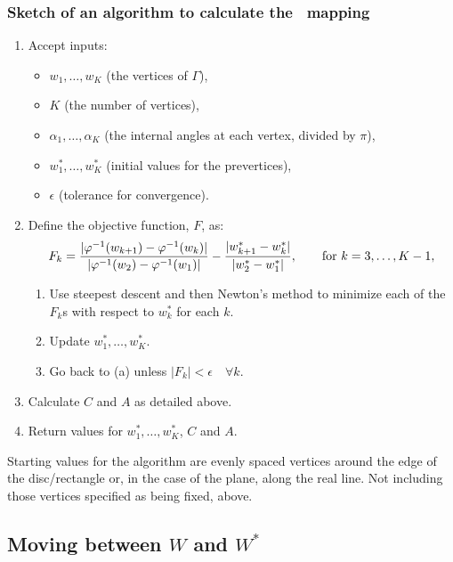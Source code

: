 \subsubsection{Sketch of an algorithm to calculate the \sch\ mapping}
\label{algorithmsketch}
\label{cor-e7}
\begin{enumerate}
\item Accept inputs:
   \begin{itemize} 
      \item $w_1,\dots,w_K$ (the vertices of $\Gamma$),
      \item $K$ (the number of vertices),
      \item $\alpha_1,\dots,\alpha_K$ (the internal angles at each vertex, divided by $\pi$),
      \item \label{cor-3s20}$w^*_1,\dots,w^*_K$ (initial values for the prevertices),
      \item $\epsilon$ (tolerance for convergence).
   \end{itemize}
\item Define the objective function, $F$, as:
 \begin{equation*}
F_k=\frac{\vert \varphi^{-1}(w_{k+1}) -  \varphi^{-1}(w_k) \vert}{\vert \varphi^{-1}(w_2)-\varphi^{-1}(w_1)\vert} - \frac{\vert w^*_{k+1} - w^*_k\vert}{\vert w^*_2 - w^*_1\vert}, \qquad \text{for } k=3,\dots,K-1,
 \end{equation*}
\begin{enumerate}
\item Use steepest descent and then Newton's method to minimize each of the $F_k$s with respect to $w^*_k$ for each $k$.
\item Update $w^*_1,\dots,w^*_K$.
\item Go back to (a) unless $\vert F_k \vert < \epsilon \quad \forall k$. 
\end{enumerate}
\item Calculate $C$ and $A$ as detailed above.
\item Return values for $w^*_1,\dots,w^*_K$, $C$ and $A$.
\end{enumerate}

Starting values for the algorithm are evenly spaced vertices around the edge of the disc/rectangle or, in the case of the plane, along the real line. Not including those vertices specified as being fixed, above.

\subsection{Moving between $W$ and $W^*$}

